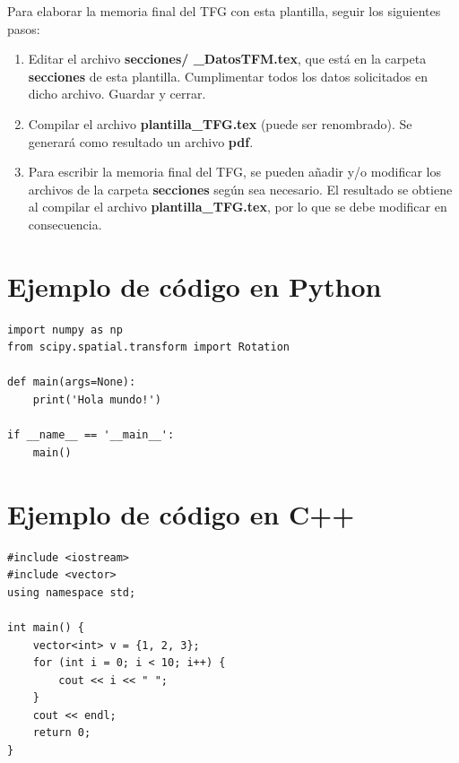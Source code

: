 \vspace*{1.5cm}
Para elaborar la memoria final del TFG con esta plantilla, seguir los siguientes pasos:
\begin{enumerate}

\item Editar el archivo \textbf{secciones/ \_DatosTFM.tex}, que está en la carpeta \textbf{secciones} de esta plantilla. Cumplimentar todos los datos solicitados en dicho archivo. Guardar y cerrar.
\item Compilar el archivo \textbf{plantilla\_TFG.tex} (puede ser renombrado). Se generará como resultado un archivo \textbf{pdf}.
\item Para escribir la memoria final del TFG, se pueden añadir y/o modificar los archivos de la carpeta \textbf{secciones} según sea necesario. El resultado se obtiene al compilar el archivo \textbf{plantilla\_TFG.tex}, por lo que se debe modificar en consecuencia.
\end{enumerate}


\section{Ejemplo de código en Python}
\begin{lstlisting}[style=Python]
import numpy as np
from scipy.spatial.transform import Rotation

def main(args=None):
    print('Hola mundo!')

if __name__ == '__main__':
    main()
\end{lstlisting}

\section{Ejemplo de código en C++}
\begin{lstlisting}[style=C++]
#include <iostream>
#include <vector>
using namespace std;

int main() {
    vector<int> v = {1, 2, 3};
    for (int i = 0; i < 10; i++) {
        cout << i << " ";
    }
    cout << endl;
    return 0;
}
\end{lstlisting}
\fi
